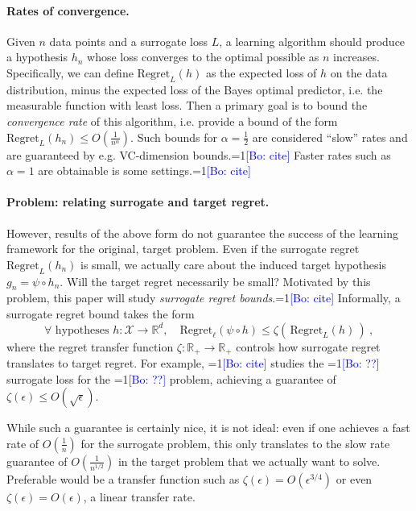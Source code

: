 \documentclass{article}
\newcommand{\Comments}{1}
\newcommand{\mynote}[2]{\ifnum\Comments=1\textcolor{#1}{#2}\fi}
\newcommand{\bo}[1]{\mynote{blue}{[Bo: #1]}}
\newcommand{\reals}{\mathbb{R}}
\newcommand{\X}{\mathcal{X}}
\newcommand{\Reg}{\mathrm{Regret}}
\begin{document}
\paragraph{Rates of convergence.}
Given $n$ data points and a surrogate loss $L$, a learning algorithm should produce a hypothesis $h_n$ whose loss converges to the optimal possible as $n$ increases.
Specifically, we can define $\Reg_{L}(h)$ as the expected loss of $h$ on the data distribution, minus the expected loss of the Bayes optimal predictor, i.e. the measurable function with least loss.
Then a primary goal is to bound the \emph{convergence rate} of this algorithm, i.e. provide a bound of the form $\Reg_{L}(h_n) \leq O\left(\tfrac{1}{n^{\alpha}}\right)$.
Such bounds for $\alpha = \tfrac{1}{2}$ are considered ``slow'' rates and are guaranteed by e.g. VC-dimension bounds.\bo{cite}
Faster rates such as $\alpha = 1$ are obtainable is some settings.\bo{cite}

\paragraph{Problem: relating surrogate and target regret.}
However, results of the above form do not guarantee the success of the learning framework for the original, target problem.
Even if the surrogate regret $\Reg_L(h_n)$ is small, we actually care about the induced target hypothesis $g_n = \psi \circ h_n$.
Will the target regret necessarily be small?
Motivated by this problem, this paper will study \emph{surrogate regret bounds}.\bo{cite}
Informally, a surrogate regret bound takes the form
\begin{equation}
  \label{eq:surrogate-regret-bound-informal}
  \forall \text{ hypotheses } h:\X\to\reals^d, \quad \Reg_\ell(\psi\circ h) \leq \zeta(\, \Reg_L(h) \,)~,
\end{equation}
where the regret transfer function $\zeta : \reals_+ \to \reals_+$ controls how surrogate regret translates to target regret.
For example, \bo{cite} studies the \bo{??} surrogate loss for the \bo{??} problem, achieving a guarantee of $\zeta(\epsilon) \leq O\left(\sqrt{\epsilon}\right)$.

While such a guarantee is certainly nice, it is not ideal: even if one achieves a fast rate of $O(\tfrac{1}{n})$ for the surrogate problem, this only translates to the slow rate guarantee of $O(\tfrac{1}{n^{1/2}})$ in the target problem that we actually want to solve.
Preferable would be a transfer function such as $\zeta(\epsilon) = O(\epsilon^{3/4})$ or even $\zeta(\epsilon) = O(\epsilon)$, a linear transfer rate.
\end{document}
